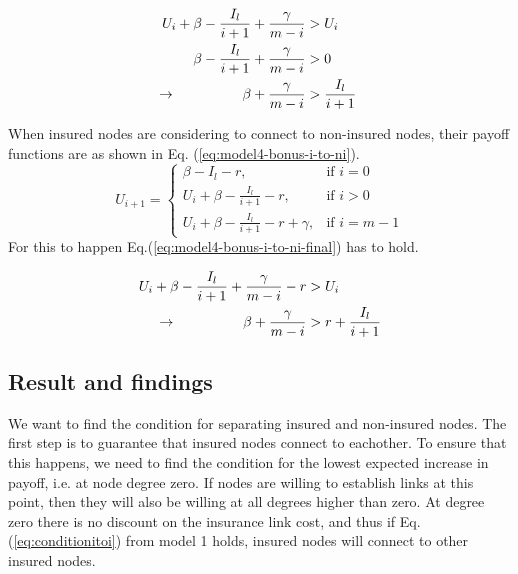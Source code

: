 \begin{eqnarray}
U_{i}+\beta-\frac{I_{l}}{i+1}+\frac{\gamma}{m-i}&>U_{i} \nonumber \\ 
\beta-\frac{I_{l}}{i+1}+\frac{\gamma}{m-i}&>0 \nonumber \\ 
\llap{$\rightarrow$\hspace{50pt}}\beta +\frac{\gamma}{m-i}&>\frac{I_{l}}{i+1}
\label{eq:model4-bonus-i-to-i}
\end{eqnarray}

When insured nodes are considering to connect to non-insured nodes, their payoff functions are as shown in Eq. (\ref{eq:model4-bonus-i-to-ni}).
\begin{equation}
U_{i+1}= 
\begin{cases}
    \beta - I_{l}-r,& \text{if } i = 0\\
    U_{i}+\beta -\frac{I_{l}}{i+1}-r,& \text{if }  i>0\\
    U_{i}+\beta -\frac{I_{l}}{i+1}-r+\gamma,& \text{if } i=m-1
\end{cases}
\label{eq:model4-bonus-i-to-ni}
\end{equation}
For this to happen Eq.(\ref{eq:model4-bonus-i-to-ni-final}) has to hold.

\begin{eqnarray}
U_{i}+\beta-\frac{I_{l}}{i+1}+\frac{\gamma}{m-i}-r&>U_{i} \nonumber \\ 
\llap{$\rightarrow$\hspace{50pt}}\beta+\frac{\gamma}{m-i}&>r+\frac{I_{l}}{i+1}
\label{eq:model4-bonus-i-to-ni-final}
\end{eqnarray}

\subsection{Result and findings}
We want to find the condition for separating insured and non-insured nodes. The first step is to guarantee that insured nodes connect to eachother. To ensure that this happens, we need to find the condition for the lowest expected increase in payoff, i.e. at node degree zero. If nodes are willing to establish links at this point, then they will also be willing at all degrees higher than zero.
At degree zero there is no discount on the insurance link cost, and thus if Eq.(\ref{eq:conditionitoi}) from model 1 holds, insured nodes will connect to other insured nodes.

